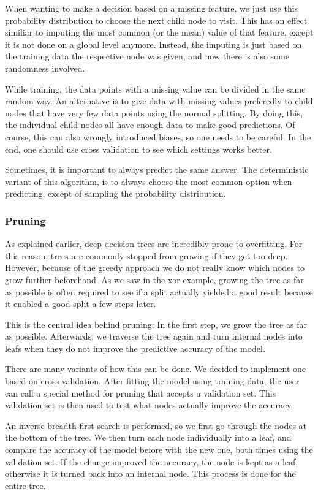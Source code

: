 \documentclass[a4paper]{article}
\begin{document}
When wanting to make a decision based on a missing feature, we just use this probability distribution to choose the next child node to visit. This has an effect similiar to imputing the most common (or the mean) value of that feature, except it is not done on a global level anymore. Instead, the imputing is just based on the training data the respective node was given, and now there is also some randomness involved.

While training, the data points with a missing value can be divided in the same random way. An alternative is to give data with missing values preferedly to child nodes that have very few data points using the normal splitting. By doing this, the individual child nodes all have enough data to make good predictions. Of course, this can also wrongly introduced biases, so one needs to be careful. In the end, one should use cross validation to see which settings works better.

Sometimes, it is important to always predict the same answer. The deterministic variant of this algorithm, is to always choose the most common option when predicting, except of sampling the probability distribution.

\subsubsection{Pruning}

As explained earlier, deep decision trees are incredibly prone to overfitting. For this reason, trees are commonly stopped from growing if they get too deep. However, because of the greedy approach we do not really know which nodes to grow further beforehand. As we saw in the xor example, growing the tree as far as possible is often required to see if a split actually yielded a good result because it enabled a good split a few steps later.

This is the central idea behind pruning: In the first step, we grow the tree as far as possible. Afterwards, we traverse the tree again and turn internal nodes into leafs when they do not improve the predictive accuracy of the model.

There are many variants of how this can be done. We decided to implement one based on cross validation. After fitting the model using training data, the user can call a special method for pruning that accepts a validation set. This validation set is then used to test what nodes actually improve the accuracy.

An inverse breadth-first search is performed, so we first go through the nodes at the bottom of the tree. We then turn each node individually into a leaf, and compare the accuracy of the model before with the new one, both times using the validation set. If the change improved the accuracy, the node is kept as a leaf, otherwise it is turned back into an internal node. This process is done for the entire tree.
\end{document}
